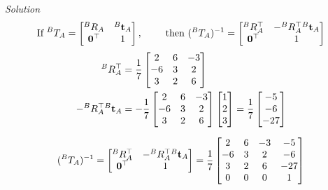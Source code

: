 \documentclass{article}
\numberwithin{prob}{section}
\newenvironment{solution}{\emph{Solution}}{}
\begin{document}
\begin{solution}
\begin{align}
  \text{If }
  ^BT_A = \begin{bmatrix}
    ^BR_A & ^B\mathbf{t}_A \\ 
    \mathbf{0}^\top & 1
  \end{bmatrix},
  \qquad \text{ then }
  ({}^BT_A)^{-1} = \begin{bmatrix}
    {}^BR^\top_A & - {}^BR^\top_A {}^B\mathbf{t}_A \\ 
    \mathbf{0}^\top & 1
  \end{bmatrix}
\end{align}
\begin{align}
  {}^BR^\top_A &= \frac{1}{7}\begin{bmatrix}
    2 & 6 & -3 \\
    -6 & 3 & 2 \\
    3 & 2 & 6
  \end{bmatrix}\\
    - {}^BR^\top_A {}^B\mathbf{t}_A &=  - \frac{1}{7}\begin{bmatrix}
    2 & 6 & -3 \\
    -6 & 3 & 2 \\
    3 & 2 & 6
    \end{bmatrix} \begin{bmatrix} 1 \\ 2 \\ 3 \end{bmatrix}
    = \frac{1}{7}\begin{bmatrix} -5 \\ -6 \\ -27 \end{bmatrix}
\end{align}

\begin{align}
  ({}^BT_A)^{-1} = \begin{bmatrix}
    {}^BR^\top_A & - {}^BR^\top_A {}^B\mathbf{t}_A \\ 
    \mathbf{0}^\top & 1
  \end{bmatrix}
  = \frac{1}{7}\begin{bmatrix}
    2 & 6 & -3 & -5\\
    -6 & 3 & 2 & -6\\
    3 & 2 & 6 & -27 \\
    0 & 0 & 0 & 1
  \end{bmatrix}
\end{align}

\end{solution}
\end{document}
